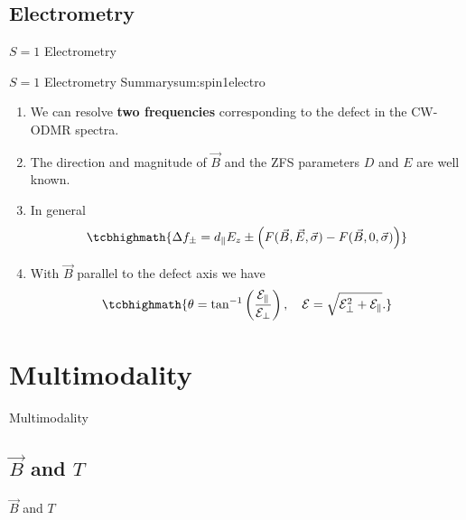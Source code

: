 \documentclass[10pt,xcolor={table,dvipsnames},c]{beamer}
\begin{document}
\subsection{Electrometry}
\begin{frame}{$S=1$ Electrometry}
	\begin{summary}{$S=1$ Electrometry Summary}{sum:spin1electro}
		\small
		\begin{enumerate}
			\item We can resolve \textbf{two frequencies} corresponding to the defect in the CW-ODMR spectra.
			\item The direction and magnitude of $\vec{B}$ and the ZFS parameters $D$ and $E$ are well known.
			\item In general 
			      \begin{equation*}
				      \tcbhighmath{
					      \Delta f _\pm = d_\parallel E_z \pm \left(F(\vec{B},\vec{E},\vec{\sigma}) - F(\vec{B},0,\vec{\sigma})\right)
				      }
			      \end{equation*}

              \item With $\vec{B}$ parallel to the defect axis we have
			      \begin{equation*}
				      \tcbhighmath{
					      \theta = \tan^{-1} \left(\frac{\mathcal{E}_\parallel}{\mathcal{E}_\perp}\right), \quad \mathcal{E} = \sqrt{\mathcal{E}_\perp^2 + \mathcal{E}_\parallel}.
				      }
			      \end{equation*}
		\end{enumerate}

	\end{summary}
\end{frame}



\section{Multimodality}
\begin{frame}{Multimodality}
\end{frame}
\subsection{$\vec{B}$ and $T$} 
\begin{frame}{$\vec{B}$ and $T$}
\end{frame}


\end{document}
